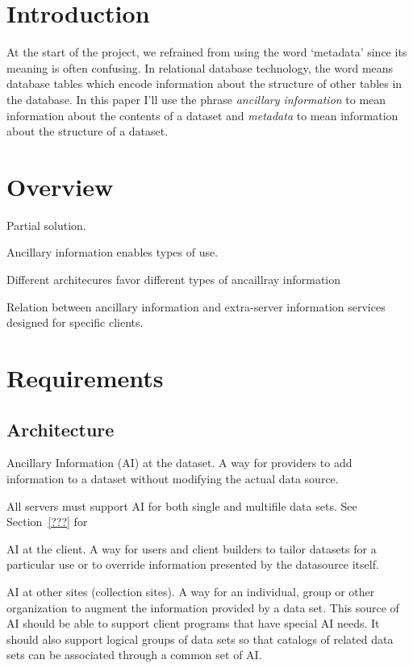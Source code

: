 \section{Introduction}

At the start of the project, we refrained from using the word `metadata'
since its meaning is often confusing. In relational database technology, the
word means database tables which encode information about the structure of
other tables in the database\cite{date:into}. In this paper I'll use the
phrase \emph{ancillary information} to mean information
about the contents of a dataset and \emph{metadata} to mean information about
the structure of a dataset.

\section{Overview}

Partial solution.

Ancillary information enables types of use.

Different architecures favor different types of ancaillray information

Relation between ancillary information and extra-server information services
designed for specific clients.

\section{Requirements}
\subsection{Architecture}

Ancillary Information (AI) at the dataset.
A way for providers to add information to a dataset without modifying
the actual data source. 

All servers must support AI for both single and multifile data
sets. See Section~\ref{???} for 

AI at the client.
A way for users and client builders to tailor datasets for a
particular use or to override information presented by the datasource
itself. 

AI at other sites (collection sites).
A way for an individual, group or other organization to augment the
information provided by a data set. This source of AI should be able
to support client programs that have special AI needs. It should also
support logical groups of data sets so that catalogs of related data
sets can be associated through a common set of AI.

